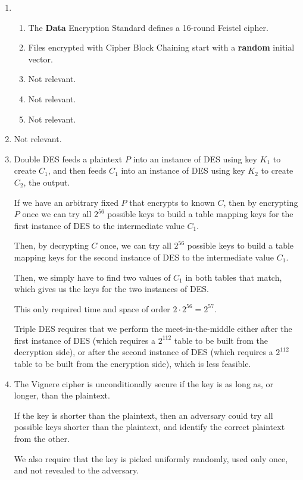 


\begin{enumerate}[label=(\alph*)]

  \item
    \begin{enumerate}[label=(\roman*)]

      \item
        The \textbf{Data} Encryption Standard defines a 16-round Feistel cipher.

      \item
        Files encrypted with Cipher Block Chaining start with a \textbf{random} initial vector.

      \item
        Not relevant.

      \item
        Not relevant.

      \item
        Not relevant.
        
    \end{enumerate}

  \item
    Not relevant.

  \item
    Double DES feeds a plaintext $P$ into an instance of DES using key $K_1$ to create $C_1$, and then feeds $C_1$ into an instance of DES using key $K_2$ to create $C_2$, the output.

    If we have an arbitrary fixed $P$ that encrypts to known $C$, then by encrypting $P$ once we can try all $2^{56}$ possible keys to build a table mapping keys for the first instance of DES to the intermediate value $C_1$.

    Then, by decrypting $C$ once, we can try all $2^{56}$ possible keys to build a table mapping keys for the second instance of DES to the intermediate value $C_1$.

    Then, we simply have to find two values of $C_1$ in both tables that match, which gives us the keys for the two instances of DES.

    This only required time and space of order $2 \cdot 2^{56} = 2^{57}$.

    Triple DES requires that we perform the meet-in-the-middle either after the first instance of DES (which requires a $2^{112}$ table to be built from the decryption side), or after the second instance of DES (which requires a $2^{112}$ table to be built from the encryption side), which is less feasible.

  \item
    The Vignere cipher is unconditionally secure if the key is as long as, or longer, than the plaintext.

    If the key is shorter than the plaintext, then an adversary could try all possible keys shorter than the plaintext, and identify the correct plaintext from the other.

    We also require that the key is picked uniformly randomly, used only once, and not revealed to the adversary.
        
\end{enumerate}

